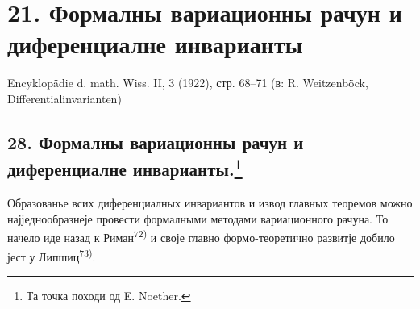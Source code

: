 ﻿\documentclass[11pt]{article}
\begin{document}

\section*{21. Формалны вариационны рачун и диференциалне инварианты}
\begin{center}
Encyklopädie d. math. Wiss. II, 3 (1922), стр. 68--71 (в: R. Weitzenböck, Differentialinvarianten)
\end{center}

\setcounter{footnote}{148}
\subsection*{28. Формалны вариационны рачун и диференциалне инварианты.\footnote{Та точка походи од E. Noether.}}

Образованье всих диференциалных инвариантов и извод главных теоремов можно најједнообразнеје провести формалными методами вариационного рачуна. То начело иде назад к Риман\textsuperscript{72)} и своје главно формо-теоретично развитје добило јест у Липшиц\textsuperscript{73)}.
\end{document}
